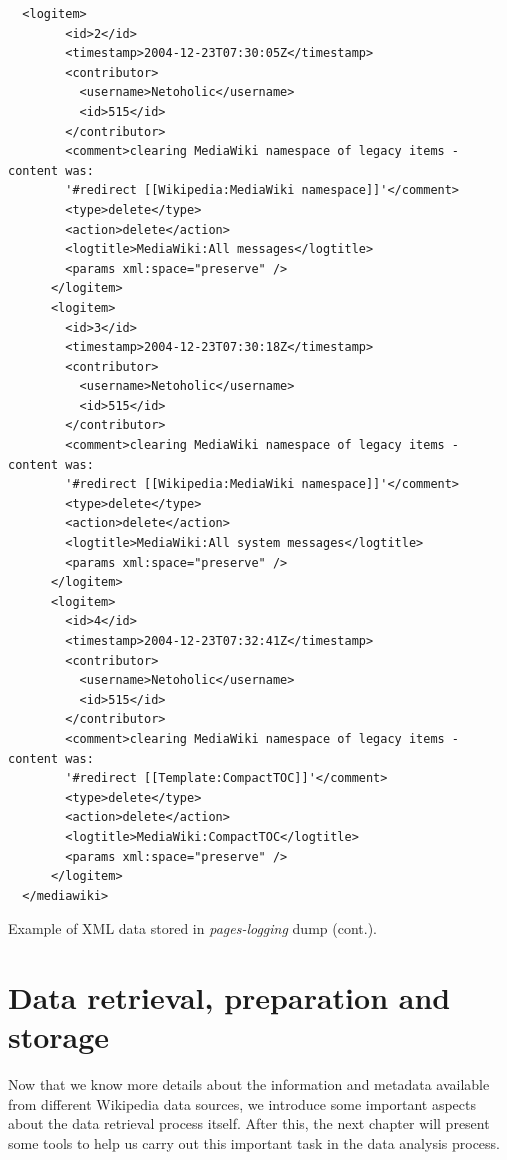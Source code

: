 \begin{program}
  \begin{small}
  \begin{verbatim}
  <logitem>
        <id>2</id>
        <timestamp>2004-12-23T07:30:05Z</timestamp>
        <contributor>
          <username>Netoholic</username>
          <id>515</id>
        </contributor>
        <comment>clearing MediaWiki namespace of legacy items - content was: 
        '#redirect [[Wikipedia:MediaWiki namespace]]'</comment>
        <type>delete</type>
        <action>delete</action>
        <logtitle>MediaWiki:All messages</logtitle>
        <params xml:space="preserve" />
      </logitem>
      <logitem>
        <id>3</id>
        <timestamp>2004-12-23T07:30:18Z</timestamp>
        <contributor>
          <username>Netoholic</username>
          <id>515</id>
        </contributor>
        <comment>clearing MediaWiki namespace of legacy items - content was: 
        '#redirect [[Wikipedia:MediaWiki namespace]]'</comment>
        <type>delete</type>
        <action>delete</action>
        <logtitle>MediaWiki:All system messages</logtitle>
        <params xml:space="preserve" />
      </logitem>
      <logitem>
        <id>4</id>
        <timestamp>2004-12-23T07:32:41Z</timestamp>
        <contributor>
          <username>Netoholic</username>
          <id>515</id>
        </contributor>
        <comment>clearing MediaWiki namespace of legacy items - content was: 
        '#redirect [[Template:CompactTOC]]'</comment>
        <type>delete</type>
        <action>delete</action>
        <logtitle>MediaWiki:CompactTOC</logtitle>
        <params xml:space="preserve" />
      </logitem>
  </mediawiki>
  \end{verbatim}
  \end{small}
  \caption{Example of XML data stored in \textit{pages-logging} dump (cont.).}
  \label{code:xml-logging-2}
\end{program}


\chapter{Data retrieval, preparation and storage}
Now that we know more details about the information and metadata available from
different Wikipedia data sources, we introduce some important aspects
about the data retrieval process itself. After this, the next chapter will present
some tools to help us carry out this important task in the data analysis process.

